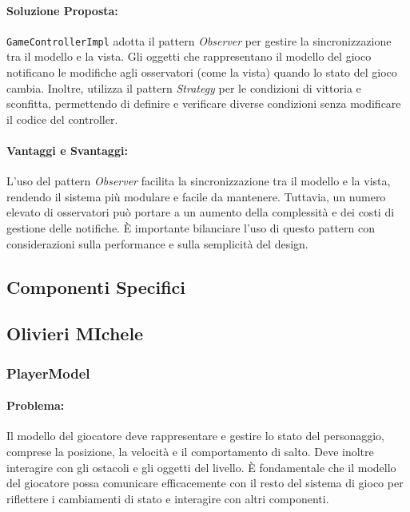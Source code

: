 \documentclass[a4paper,12pt]{report}
\begin{document}
	\paragraph{Soluzione Proposta:} \texttt{GameControllerImpl} adotta il pattern \textit{Observer} per gestire la sincronizzazione tra il modello e la vista. Gli oggetti che rappresentano il modello del gioco notificano le modifiche agli osservatori (come la vista) quando lo stato del gioco cambia. Inoltre, utilizza il pattern \textit{Strategy} per le condizioni di vittoria e sconfitta, permettendo di definire e verificare diverse condizioni senza modificare il codice del controller.
	
	\paragraph{Vantaggi e Svantaggi:} 
	L'uso del pattern \textit{Observer} facilita la sincronizzazione tra il modello e la vista, rendendo il sistema più modulare e facile da mantenere. Tuttavia, un numero elevato di osservatori può portare a un aumento della complessità e dei costi di gestione delle notifiche. È importante bilanciare l'uso di questo pattern con considerazioni sulla performance e sulla semplicità del design.
	
	\subsection{Componenti Specifici}
	
	\subsection{Olivieri MIchele}
	
	\subsubsection{PlayerModel}
	
	\paragraph{Problema:} Il modello del giocatore deve rappresentare e gestire lo stato del personaggio, comprese la posizione, la velocità e il comportamento di salto. Deve inoltre interagire con gli ostacoli e gli oggetti del livello. È fondamentale che il modello del giocatore possa comunicare efficacemente con il resto del sistema di gioco per riflettere i cambiamenti di stato e interagire con altri componenti.
	
\end{document}
